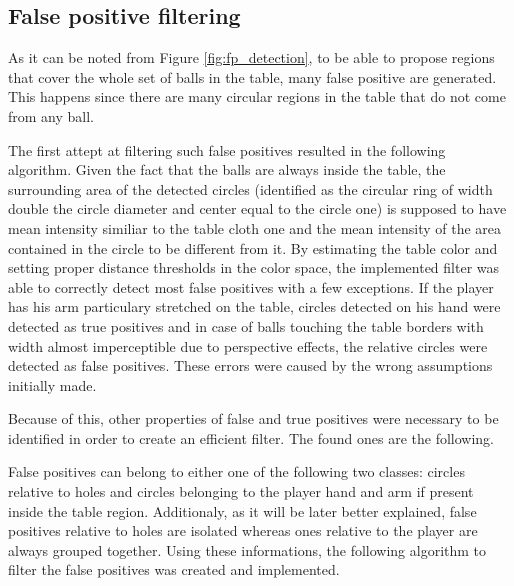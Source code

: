 \subsection{False positive filtering}
As it can be noted from Figure \ref{fig:fp_detection}, to be able to propose regions that cover the whole set of balls in the table, many 
false positive are generated. This happens since there are many circular regions in the table that do not come from any ball.

The first attept at filtering such false positives resulted in the following algorithm. Given the fact that the balls are always inside the table, the surrounding area
of the detected circles (identified as the circular ring of width double the circle diameter and center equal to the circle one) is supposed to have mean intensity similiar to the table 
cloth one and the mean intensity of the area contained in the circle to be different from it. By estimating the table color
and setting proper distance thresholds in the color space, the implemented filter was able to correctly detect most false positives with a few exceptions.
If the player has his arm particulary stretched on the table, circles detected on his hand were detected as true positives and in case of balls touching the table borders with
width almost imperceptible due to perspective effects, the relative circles were detected as false positives.
These errors were caused by the wrong assumptions initially made.

Because of this, other properties of false and true positives were necessary to be identified in order to create an efficient filter.
The found ones are the following.

False positives can belong to either one of the following two classes: circles relative to holes and circles belonging to the player hand and arm if present 
inside the table region. Additionaly, as it will be later better explained, false positives relative to holes are isolated whereas ones relative to the player are always
grouped together. Using these informations, the following algorithm to filter the false positives was created and implemented.

